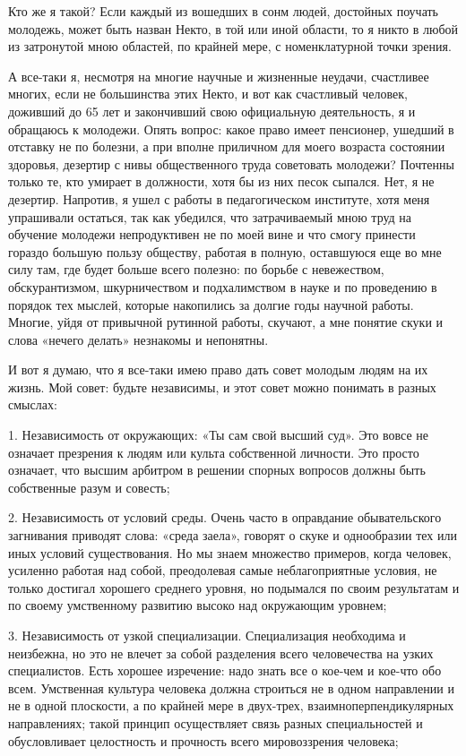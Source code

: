Кто же я такой? Если каждый из вошедших в сонм людей, достойных
поучать молодежь, может быть назван Некто, в той или иной области, то
я никто в любой из затронутой мною областей, по крайней мере, с
номенклатурной точки зрения.

А все-таки я, несмотря на многие научные и жизненные неудачи,
счастливее многих, если не большинства этих Некто, и вот как
счастливый человек, доживший до 65 лет и закончивший свою официальную
деятельность, я и обращаюсь к молодежи. Опять вопрос: какое право
имеет пенсионер, ушедший в отставку не по болезни, а при вполне
приличном для моего возраста состоянии здоровья, дезертир с нивы
общественного труда советовать молодежи? Почтенны только те, кто
умирает в должности, хотя бы из них песок сыпался. Нет, я не дезертир.
Напротив, я ушел с работы в педагогическом институте, хотя меня
упрашивали остаться, так как убедился, что затрачиваемый мною труд на
обучение молодежи непродуктивен не по моей вине и что смогу принести
гораздо большую пользу обществу, работая в полную, оставшуюся еще во
мне силу там, где будет больше всего полезно: по борьбе с невежеством,
обскурантизмом, шкурничеством и подхалимством в науке и по проведению
в порядок тех мыслей, которые накопились за долгие годы научной
работы. Многие, уйдя от привычной рутинной работы, скучают, а мне
понятие скуки и слова «нечего делать» незнакомы и непонятны.

И вот я думаю, что я все-таки имею право дать совет молодым людям на
их жизнь. Мой совет: будьте независимы, и этот совет можно понимать в
разных смыслах:

1. Независимость от окружающих: «Ты сам свой высший суд». Это вовсе не
означает презрения к людям или культа собственной личности. Это просто
означает, что высшим арбитром в решении спорных вопросов должны быть
собственные разум и совесть;

2. Независимость от условий среды. Очень часто в оправдание
обывательского загнивания приводят слова: «среда заела», говорят о
скуке и однообразии тех или иных условий существования. Но мы знаем
множество примеров, когда человек, усиленно работая над собой,
преодолевая самые неблагоприятные условия, не только достигал хорошего
среднего уровня, но подымался по своим результатам и по своему
умственному развитию высоко над окружающим уровнем;

3. Независимость от узкой специализации. Специализация необходима и
неизбежна, но это не влечет за собой разделения всего человечества на
узких специалистов. Есть хорошее изречение: надо знать все о кое-чем и
кое-что обо всем. Умственная культура человека должна строиться не в
одном направлении и не в одной плоскости, а по крайней мере в
двух-трех, взаимноперпендикулярных направлениях; такой принцип
осуществляет связь разных специальностей и обусловливает целостность и
прочность всего мировоззрения человека;

